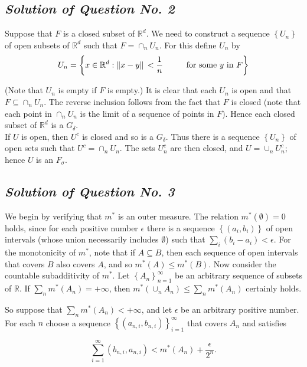 \documentclass[12pt, a4paper]{article} %
\begin{document}
\subsection{\slshape Solution of Question No. 2}

Suppose that $F$ is a closed subset of $\mathbb{R}^d$. We need to construct a sequence
$\left\{U_n\right\}$ of open subsets of $\mathbb{R}^d$ such that $F = \cap_n U_n$. For this define $U_n$ by
\[U_n = \left\{x \in \mathbb{R}^d : \norm*{x-y} < \frac{1}{n}\hspace*{1cm} \mbox{for some $y$ in $F$}\right\}\]

(Note that $U_n$ is empty if $F$ is empty.) It is clear that each $U_n$ is open and that $F \subseteq \cap_n U_n$. The reverse inclusion follows from the fact that $F$ is closed (note that each point in $\cap_n U_n$ is the limit of a sequence of points in $F$). Hence each closed subset of $\mathbb{R}^d$ is a $G_\delta$.\\[2mm]
If $U$ is open, then $U^c$ is closed and so is a $G_\delta$. Thus there is a sequence $\left\{U_n\right\}$ of open sets such that $U^c = \cap_n U_n$. The sets $U^c_n$ are then closed, and $U = \cup_n U^c_n$; hence $U$ is an $F_\sigma$.


\subsection{\slshape Solution of Question No. 3}

We begin by verifying that $m^*$ is an outer measure. The relation $m^*(\emptyset) = 0$ holds, since for each positive number $\epsilon$ there is a sequence $\left\{(a_i,b_i)\right\}$ of open intervals (whose union necessarily includes $\emptyset$) such that $\sum_{i}^{}(b_i - a_i) < \epsilon$. For the monotonicity of $m^*$, note that if $A \subseteq B$, then each sequence of open intervals that covers $B$ also covers $A$, and so $m^*(A) \leq m^*(B)$. Now consider the countable subadditivity of $m^*$. Let $\left\{A_n\right\}_{n=1}^{\infty}$
be an arbitrary sequence of subsets of $\mathbb{R}$.
If $\sum_{n}^{}m^*(A_n)=+\infty$, then $m^*(\cup_{n} A_n) \leq \sum_{n}^{}m^*(A_n)$ certainly holds. 

So suppose that $\sum_{n}^{}m^*(A_n) < +\infty$, and let $\epsilon$ be an arbitrary positive number. For each $n$ choose a
sequence $\left\{(a_{n,i},b_{n,i})\right\}_{i=1}^{\infty}$ that covers $A_n$ and satisfies

\[\sum_{i=1}^{\infty}\left(b_{n,i}, a_{n,i}\right) < m^*(A_n) + \frac{\epsilon}{2^n}.\]
\end{document}

